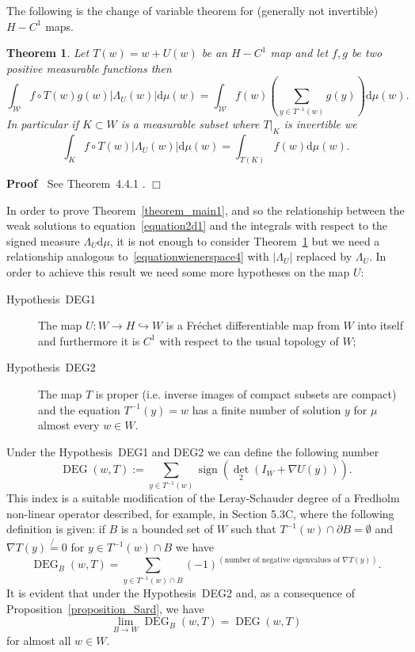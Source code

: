 \documentclass[a4paper,10pt]{article}
\newcommand{\assign}{:=}
\newcommand{\mathd}{\mathrm{d}}
\newcommand{\nobracket}{}
\newcommand{\tmop}[1]{\ensuremath{\operatorname{#1}}}
\newenvironment{proof}{\noindent\textbf{Proof\ }}{\hspace*{\fill}$\Box$\medskip}
\newtheorem{theorem}{Theorem}
\begin{document}
The following is the change of variable theorem for (generally not invertible)
$H - C^1$ maps. \

\begin{theorem}
  \label{theorem_Lambda}Let $T (w) = w + U (w)$ be an $H - C^1$ map and let
  $f, g$ be two positive measurable functions then
  \begin{equation}
    \int_{\mathcal{W}} f \circ T (w) g (w) | \Lambda_U (w) | \mathd \mu (w) =
    \int_{\mathcal{W}} f (w) \left( \sum_{y \in T^{- 1} (w)} g (y) \right)
    \mathd \mu (w) . \label{equationwienerspace4}
  \end{equation}
  In particular if $K \subset W$ is a measurable subset where $\nobracket T
  |_K$ is invertible we
  \[ \int_K f \circ T (w) | \Lambda_U (w) | \mathd \mu (w) = \int_{T (K)} f
     (w) \mathd \mu (w) . \]
\end{theorem}

\begin{proof}
  See Theorem~4.4.1 {\cite{Ustunel2000}}.
\end{proof}

In order to prove Theorem~\ref{theorem_main1}, and so the relationship between
the weak solutions to equation~{\eqref{equation2d1}} and the integrals with
respect to the signed measure $\Lambda_U \mathd \mu$, it is not enough to
consider Theorem~\ref{theorem_Lambda} but we need a relationship analogous
to~{\eqref{equationwienerspace4}} with $| \Lambda_U |$ replaced by
$\Lambda_U$. In order to achieve this result we need some more hypotheses on
the map $U$:
\begin{description}
  \item[Hypothesis~DEG1] The map $U : W \rightarrow H \hookrightarrow W$ is a
  Fr{\'e}chet differentiable map from $W$ into itself and furthermore it is
  $C^1$ with respect to the usual topology of $W$;
  
  \item[Hypothesis~DEG2] The map $T$ is proper (i.e. inverse images of compact
  subsets are compact) and the equation $T^{- 1} (y) = w$ has a finite number
  of solution $y$ for $\mu$ almost every $w \in W$. 
\end{description}
Under the Hypothesis~DEG1 and DEG2 we can define the following number
\[ \tmop{DEG} (w, T) \assign \sum_{y \in T^{- 1} (w)} \tmop{sign} (\det_2 (I_W
   + \nabla U (y))) . \]
This index is a suitable modification of the Leray-Schauder degree of a
Fredholm non-linear operator described, for example, in {\cite{Berger1977}}
Section 5.3C, where the following definition is given: if $B$ is a bounded set
of $W$ such that $T^{- 1} (w) \cap \partial B = \emptyset$ and $\nabla T (y)
\not{=} 0$ for $y \in T^{- 1} (w) \cap B$ we have
\[ \tmop{DEG}_B (w, T) = \sum_{y \in T^{- 1} (w) \cap B} (- 1)^{\left(
   \text{number of negative eigenvalues of $\nabla T (y)$} \right)} . \]
It is evident that under the Hypothesis~DEG2 and, as a consequence of
Proposition~\ref{proposition_Sard}, we have
\[ \lim_{B \rightarrow W} \tmop{DEG}_B (w, T) = \tmop{DEG} (w, T) \]
for almost all $w \in W$.
\end{document}
